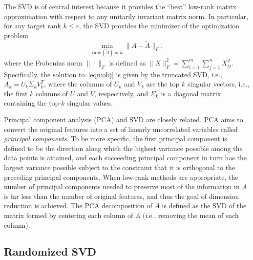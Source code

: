  
The SVD is of central interest because it provides the ``best'' low-rank matrix approximation with respect to any unitarily invariant matrix norm.
In particular, for any target rank $k \leq r$, the SVD provides the minimizer of the optimization problem
\begin{equation}
 \label{eqn:obj}
  \min_{\text{rank}(\tilde A) = k} \| A - \tilde A \|_F,
\end{equation}
where the Frobenius norm $\| \cdot \|_F$ is defined as $\|X\|_F^2 =
\sum_{i=1}^m \sum_{j=1}^n X_{ij}^2 $. Specifically, the solution
to~\eqref{eqn:obj} is given by the truncated SVD, i.e., $A_k = U_k \Sigma_k
V_k^T$, where the columns of $U_k$ and $V_k$ are the top $k$ singular vectors,
i.e., the first $k$ columns of $U$ and $V$, respectively, and $\Sigma_k$ is a 
diagonal matrix containing the top-$k$ singular values.

Principal component analysis (PCA) and SVD are closely related.
PCA aims to convert the original features into a set of linearly uncorrelated variables called {\it principal components}.
To be more specific, the first principal component is defined to be the direction along which the highest variance possible among the data points is attained, and each succeeding principal component in turn has the largest variance possible subject to the constraint that it is orthogonal to the preceding principal components.
When low-rank methods are appropriate, the number of principal components needed to preserve most of the information in $A$ is far less than the number of original features, and thus the goal of dimension reduction is achieved.
The PCA decomposition of $A$ is defined as the SVD of the matrix formed by centering each column of $A$ (i.e., removing the mean of each column).

\subsection{Randomized SVD}

